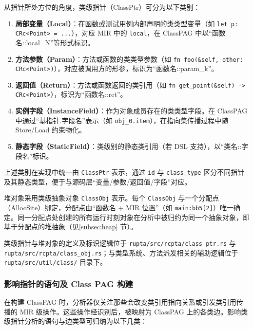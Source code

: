 从指针所处方位的角度，类级指针（ClassPtr）可分为以下类别：

\begin{enumerate}
    \item \textbf{局部变量（Local）}：在函数或测试用例内部声明的类类型变量（如 \texttt{let p: CRc<Point> = ...}），对应 MIR 中的 \texttt{local}，在 ClassPAG 中以“函数名::local\_N”等形式标识。
    
    \item \textbf{方法参数（Param）}：方法或函数的类类型参数（如 \texttt{fn foo(\&self, other: CRc<Point>)}），对应被调用方的形参，标识为“函数名::param\_k”。
    
    \item \textbf{返回值（Return）}：方法或函数返回的类引用（如 \texttt{fn get\_point(\&self) -> CRc<Point>}），标识为“函数名::ret”。
    
    \item \textbf{实例字段（InstanceField）}：作为对象成员存在的类类型字段。在 ClassPAG 中通过“基指针.字段名”表示（如 \texttt{obj\_0.item}），在指向集传播过程中随 Store/Load 约束物化。
    
    \item \textbf{静态字段（StaticField）}：类级别的静态类引用（若 DSL 支持），以“类名::字段名”标识。
\end{enumerate}

上述类别在实现中统一由 \texttt{ClassPtr} 表示，通过 \texttt{id} 与 \texttt{class\_type} 区分不同指针及其静态类型，便于与源码层“变量/参数/返回值/字段”对应。

堆对象采用类级抽象对象 \texttt{ClassObj} 表示。每个 \texttt{ClassObj} 与一个分配点（AllocSite）绑定，分配点由“函数名 + MIR 位置”（如 \texttt{main:bb5[2]}）唯一确定。同一分配点处创建的所有运行时刻对象在分析中被归约为同一个抽象对象，即基于分配点的堆抽象（见\ref{subsec:heap} 节）。

类级指针与堆对象的定义及标识逻辑位于 \texttt{rupta/src/rcpta/class\_ptr.rs} 与 \texttt{rupta/src/rcpta/class\_obj.rs}；与类型系统、方法派发相关的辅助逻辑位于 \texttt{rupta/src/util/class/} 目录下。

\subsubsection{\heiti 影响指针的语句及 Class PAG 构建}

在构建 ClassPAG 时，分析器仅关注那些会改变类引用指向关系或引发类引用传播的 MIR 级操作。这些操作经识别后，被映射为 ClassPAG 上的各类边。影响类级指针分析的语句与边类型可归纳为以下几类：


